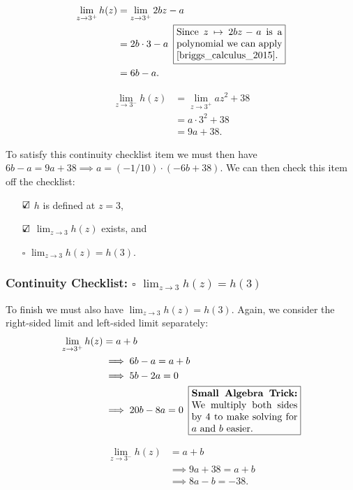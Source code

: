 \documentclass{article}
\theoremstyle{definition}
\begin{document}
\begin{Solution}
  \begin{align*}
    \lim_{z \to 3^+} h(z) &= \lim_{z \to 3^+} 2bz - a\\
    &= 2b\cdot 3 - a \hspace{0.5em}\fbox{\parbox[c][]{1.5in}{Since $z \mapsto 2bz-a$ is a polynomial we can apply \cite[Theorem 2.4, page 71]{briggs_calculus_2015}.}} \\
    &= 6b - a.
  \end{align*}

  \begin{align*}
    \lim_{z \to 3^-} h(z) &= \lim_{z \to 3^+} az^2 + 38\\
    &= a\cdot 3^2 +38 \\
    &= 9a + 38.
  \end{align*}

  To satisfy this continuity checklist item we must then have $6b - a = 9a + 38 \implies a = (-1/10) \cdot (-6b + 38)$.
  We can then check this item off the checklist:
  \begin{itemize}
    \item[$\text{\rlap{$\checkmark$}}\square$]
      $h$ is defined at $z = 3$,

    \item[$\text{\rlap{$\checkmark$}}\square$]
      $\lim_{z \to 3} h(z)$ exists, and

    \item[$\square$]  
      $\lim_{z \to 3} h(z) = h(3)$.
  \end{itemize}

  \subsubsection*{Continuity Checklist: $\square$ $\lim_{z \to 3} h(z) = h(3)$}
  To finish we must also have $\lim_{z \to 3} h(z) = h(3)$.
  Again, we consider the right-sided limit and left-sided limit separately:
  \begin{align*}
    \lim_{z \to 3^+} h(z) &= a + b \\
    &\implies 6b - a = a + b \\
    &\implies 5b - 2a = 0\\
    &\implies 20b - 8a = 0 \hspace{0.5em}\fbox{\parbox[c][]{1.5in}{\textbf{Small Algebra Trick:} We multiply both sides by 4 to make solving for $a$ and $b$ easier.}}
  \end{align*}

  \begin{align*}
    \lim_{z \to 3^-} h(z) &= a + b \\
    &\implies 9a + 38 = a + b \\
    &\implies 8a - b  = -38.
  \end{align*}


\end{Solution}
\end{document}
